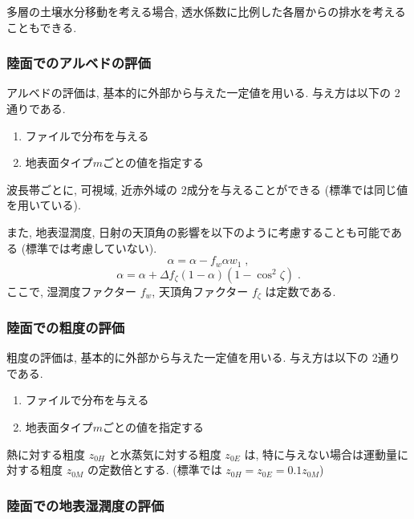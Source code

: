 多層の土壌水分移動を考える場合, 
透水係数に比例した各層からの排水を考えることもできる. 

\subsubsection{陸面でのアルベドの評価}

アルベドの評価は, 基本的に外部から与えた一定値を用いる. 
与え方は以下の 2通りである. 
\begin{enumerate}
    \item ファイルで分布を与える
    \item 地表面タイプ$m$ごとの値を指定する
\end{enumerate}

波長帯ごとに, 可視域, 近赤外域の 2成分を与えることができる
(標準では同じ値を用いている). 

また, 地表湿潤度, 日射の天頂角の影響を以下のように考慮することも可能である
(標準では考慮していない). 
\begin{equation}
  \alpha = \alpha - f_w \alpha w_1 \; ,
\end{equation}
\begin{equation}
  \alpha = \alpha + \Delta f_{\zeta} (1 - \alpha)(1 - \cos^2 \zeta) \; .
\end{equation}
ここで, 湿潤度ファクター $f_w$, 天頂角ファクター $f_{\zeta}$ は定数である. 

\subsubsection{陸面での粗度の評価}

粗度の評価は, 基本的に外部から与えた一定値を用いる. 
与え方は以下の 2通りである. 
\begin{enumerate}
    \item ファイルで分布を与える
    \item 地表面タイプ$m$ごとの値を指定する
\end{enumerate}

熱に対する粗度 $z_{0H}$ と水蒸気に対する粗度 $z_{0E}$ は, 
特に与えない場合は運動量に対する粗度 $z_{0M}$ の定数倍とする. 
(標準では $z_{0H} = z_{0E} = 0.1 z_{0M}$)

\subsubsection{陸面での地表湿潤度の評価}

